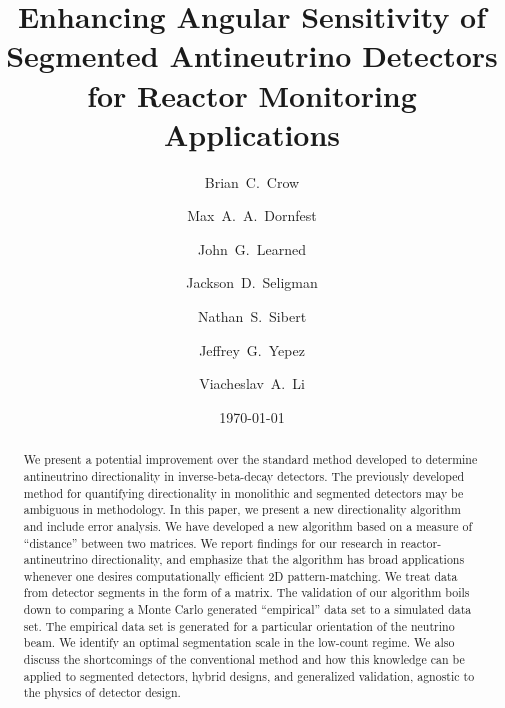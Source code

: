 \documentclass[tightenlines,
twocolumn,prl,notitlepage,nofootinbib,preprintnumbers,longbibliography]{revtex4-1}
\begin{document}
\title{Enhancing Angular Sensitivity of Segmented Antineutrino Detectors for Reactor Monitoring Applications}

\author{Brian~C.~Crow}
\author{Max~A.~A.~Dornfest}
\author{John~G.~Learned}
\author{Jackson~D.~Seligman}
\author{Nathan~S.~Sibert}
\author{Jeffrey~G.~Yepez}
\author{Viacheslav~A.~Li}

\date{\today}

\begin{abstract}
We present a potential improvement over the standard method developed to determine antineutrino directionality in inverse-beta-decay detectors. The previously developed method for quantifying directionality in monolithic and segmented detectors may be ambiguous in methodology. In this paper, we present a new directionality algorithm and include error analysis. We have developed a new algorithm based on a measure of ``distance'' between two matrices. We report findings for our research in reactor-antineutrino directionality, and emphasize that the algorithm has broad applications whenever one desires computationally efficient 2D pattern-matching.
We treat data from detector segments in the form of a matrix.
The validation of our algorithm boils down to comparing a Monte Carlo generated ``empirical'' data set to a simulated data set. 
The empirical data set is generated for a particular orientation of the neutrino beam.
We identify an optimal segmentation scale in the low-count regime.
We also discuss the shortcomings of the conventional method and how this knowledge can be applied to segmented detectors, hybrid designs, and generalized validation, agnostic to the physics of detector design.
\end{abstract}
\maketitle %
\end{document}
